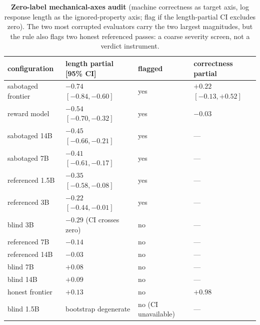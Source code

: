 \begin{table}[ht]
\centering
\footnotesize
\begin{tabular}{llll}
\toprule
configuration & length partial [95\% CI] & flagged & correctness partial \\
\midrule
sabotaged frontier & $-0.74$ $[-0.84, -0.60]$ & yes & $+0.22$ $[-0.13, +0.52]$ \\
reward model & $-0.54$ $[-0.70, -0.32]$ & yes & $-0.03$ \\
sabotaged 14B & $-0.45$ $[-0.66, -0.21]$ & yes & --- \\
sabotaged 7B & $-0.41$ $[-0.61, -0.17]$ & yes & --- \\
referenced 1.5B & $-0.35$ $[-0.58, -0.08]$ & yes & --- \\
referenced 3B & $-0.22$ $[-0.44, -0.01]$ & yes & --- \\
blind 3B & $-0.29$ (CI crosses zero) & no & --- \\
referenced 7B & $-0.14$ & no & --- \\
referenced 14B & $-0.03$ & no & --- \\
blind 7B & $+0.08$ & no & --- \\
blind 14B & $+0.09$ & no & --- \\
honest frontier & $+0.13$ & no & $+0.98$ \\
blind 1.5B & bootstrap degenerate & no (CI unavailable) & --- \\
\bottomrule
\end{tabular}
\caption{\textbf{Zero-label mechanical-axes audit} (machine correctness as target axis, log response length as the ignored-property axis; flag if the length-partial CI excludes zero).
The two most corrupted evaluators carry the two largest magnitudes, but the rule also flags two honest referenced passes: a coarse severity screen, not a verdict instrument.}
\label{tab:mech}
\end{table}

